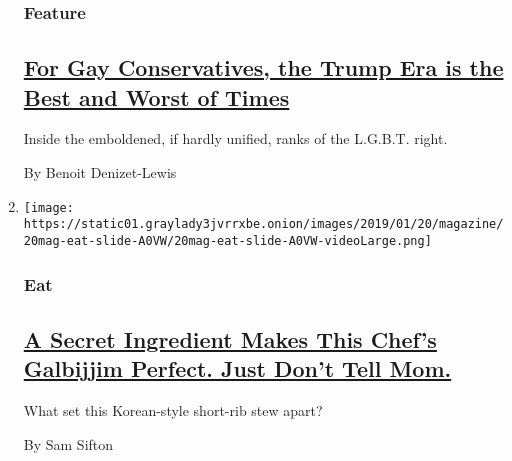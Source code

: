 \begin{enumerate}
  \hypertarget{feature-1}{%
  \subsubsection{Feature}\label{feature-1}}

  \hypertarget{for-gay-conservatives-the-trump-era-is-the-best-and-worst-of-times}{%
  \subsection{\texorpdfstring{\href{/2019/01/11/magazine/gay-conservative-trump-era.html}{For
  Gay Conservatives, the Trump Era is the Best and Worst of
  Times}}{For Gay Conservatives, the Trump Era is the Best and Worst of Times}}\label{for-gay-conservatives-the-trump-era-is-the-best-and-worst-of-times}}

  Inside the emboldened, if hardly unified, ranks of the L.G.B.T. right.

  By Benoit Denizet-Lewis
\item
  \texttt{[image: https://static01.graylady3jvrrxbe.onion/images/2019/01/20/magazine/20mag-eat-slide-A0VW/20mag-eat-slide-A0VW-videoLarge.png]}

  \hypertarget{eat}{%
  \subsubsection{Eat}\label{eat}}

  \hypertarget{a-secret-ingredient-makes-this-chefs-galbijjim-perfect-just-dont-tell-mom}{%
  \subsection{\texorpdfstring{\href{/2019/01/16/magazine/galbijjim-korean-stew-recipe.html}{A
  Secret Ingredient Makes This Chef's Galbijjim Perfect. Just Don't Tell
  Mom.}}{A Secret Ingredient Makes This Chef's Galbijjim Perfect. Just Don't Tell Mom.}}\label{a-secret-ingredient-makes-this-chefs-galbijjim-perfect-just-dont-tell-mom}}

  What set this Korean-style short-rib stew apart?

  By Sam Sifton
\end{enumerate}

